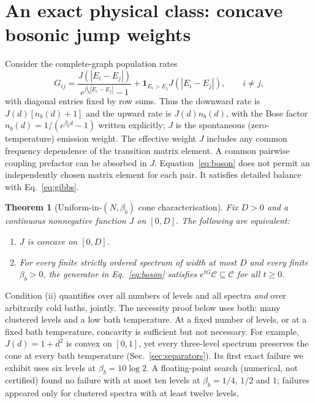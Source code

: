 \documentclass[11pt,a4paper]{article}
\newtheorem{theorem}{Theorem}
\theoremstyle{remark}\newtheorem{remark}[theorem]{Remark}
\newcommand{\C}{\mathcal C}
\begin{document}
\section{An exact physical class: concave bosonic jump weights}\label{sec:physical}
Consider the complete-graph population rates
\begin{equation}
 G_{ij}=\frac{J(|E_i-E_j|)}{e^{\beta_b|E_i-E_j|}-1}
       +\mathbf1_{E_i>E_j}J(|E_i-E_j|),\qquad i\ne j,
 \label{eq:boson}
\end{equation}
with diagonal entries fixed by row sums. Thus the downward rate is $J(d)[n_b(d)+1]$ and the upward rate is $J(d)n_b(d)$, with the Bose factor $n_b(d)=1/(e^{\beta_bd}-1)$ written explicitly; $J$ is the spontaneous (zero-temperature) emission weight. The effective weight $J$ includes any common frequency dependence of the transition matrix element. A common pairwise coupling prefactor can be absorbed in $J$. Equation~\eqref{eq:boson} does not permit an independently chosen matrix element for each pair. It satisfies detailed balance with Eq.~\eqref{eq:gibbs}.

\begin{theorem}[Uniform-in-$(N,\beta_b)$ cone characterisation]\label{thm:concavity}
Fix $D>0$ and a continuous nonnegative function $J$ on $[0,D]$. The following are equivalent:
\begin{enumerate}[label=(\roman*)]
\item $J$ is concave on $[0,D]$.
\item For every finite strictly ordered spectrum of width at most $D$ and every finite $\beta_b>0$, the generator in Eq.~\eqref{eq:boson} satisfies $e^{tG}\C\subseteq\C$ for all $t\ge0$.
\end{enumerate}
\end{theorem}
Condition (ii) quantifies over all numbers of levels and all spectra \emph{and} over arbitrarily cold baths, jointly. The necessity proof below uses both: many clustered levels and a low bath temperature. At a fixed number of levels, or at a fixed bath temperature, concavity is sufficient but not necessary. For example, $J(d)=1+d^2$ is convex on $[0,1]$, yet every three-level spectrum preserves the cone at every bath temperature (Sec.~\ref{sec:separators}). Its first exact failure we exhibit uses six levels at $\beta_b=10\log2$. A floating-point search (numerical, not certified) found no failure with at most ten levels at $\beta_b=1/4$, $1/2$ and $1$; failures appeared only for clustered spectra with at least twelve levels.
\end{document}
